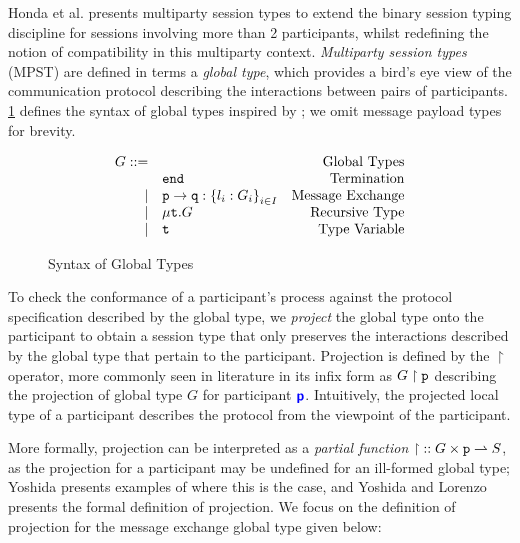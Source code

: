Honda et al. \cite{MPAST} presents {multiparty session types} 
to extend the 
binary session typing discipline for 
sessions involving more than 2 participants, 
whilst redefining the notion of compatibility 
in this multiparty context. 
\textit{Multiparty session types} (MPST)
are defined in terms a \textit{global type},
which provides a bird's eye view of the communication protocol
describing the interactions between pairs of participants. 
\cref{fig:globaltypes} defines the syntax of global types
inspired by \cite{MPST};
we omit message payload types for brevity.

\begin{figure}[!hb]
\doublespacing
\[
\begin{array}{rlr}

G ::= & & \text{Global Types} \\
     & \textnormal{\texttt{end}} & \text{Termination} \\
\mid & {\mathtt{p}} \to {\mathtt{q}} : \left\{ {l_i: G_i} \right\}_{i \in I} & \text{Message Exchange} \\
\mid & \mu\textnormal{\texttt{t}}.{G} & \text{Recursive Type} \\
\mid & \textnormal{\texttt{t}} & \text{Type Variable} \\
\end{array}
\]
\singlespacing
\caption{Syntax of Global Types}
\label{fig:globaltypes}
\end{figure}

To check the conformance of a participant's process 
against the protocol specification 
described by the global type, 
we \textit{project} the global type onto the participant
to obtain a session type that only preserves the 
interactions described by the global type that 
pertain to the participant. 
Projection is defined by the $\upharpoonright$ operator, 
more commonly seen in literature in its infix form 
as ${G} \upharpoonright {\mathtt{p}}$ describing the projection of global type 
$G$ for participant ${\color{blue}\bm{\mathsf{p}}}$. 
Intuitively, the projected local type of a participant 
describes the protocol from the viewpoint of the participant.

More formally, projection can be interpreted as a 
\textit{partial function} 
${\upharpoonright} :: G \times {\mathtt{p}} \rightharpoonup S$,
as the projection for a participant may be undefined for 
an ill-formed global type; 
Yoshida \cite{C406Lecture} presents examples of where this is the case, 
and Yoshida and Lorenzo \cite{MPST} 
presents the formal definition of projection.
We focus on the definition of projection for the 
message exchange global type given below:

